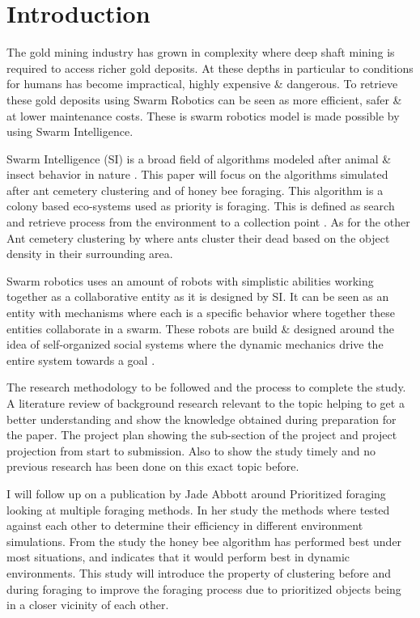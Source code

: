 \documentclass[12pt]{article}
\begin{document}
\section{Introduction}

\par{The gold mining industry has grown in complexity where deep shaft mining is required to access richer gold deposits. At these depths in particular to conditions for humans has become impractical, highly expensive \& dangerous. To retrieve these gold deposits using Swarm Robotics can be seen as more efficient, safer \& at lower maintenance costs. These is swarm robotics model is made possible by using Swarm Intelligence.}
\\
\par{Swarm Intelligence (SI) is a broad field of algorithms modeled after animal \& insect behavior in nature \cite{SI}. This paper will focus on the algorithms simulated after ant cemetery clustering and of honey bee foraging. This algorithm is a colony based eco-systems used as priority is foraging. This is defined as search and retrieve process from the environment to a collection point \cite{Forage-09}. As for the other Ant cemetery clustering by \cite{Lumer-Faieta} where ants cluster their dead based on the object density in their surrounding area.}
\\
\par{Swarm robotics uses an amount of robots with simplistic abilities working together as a collaborative entity \cite{Robots-Dorigo} as it is designed by SI. It can be seen as an entity with mechanisms where each is a specific behavior where together these entities collaborate in a swarm. These robots are build \& designed around the idea of self-organized social systems where the dynamic mechanics drive the entire system towards a goal \cite{SI}.}
\\
\par{The research methodology to be followed and the process to complete the study. A literature review of background research relevant to the topic helping to get a better understanding and show the knowledge obtained during preparation for the paper. The project plan showing the sub-section of the project and project projection from start to submission. Also to show the study timely and no previous research has been done on this exact topic before.}
\\
\par{I will follow up on a publication by Jade Abbott \cite{Jade-2014} around Prioritized foraging looking at multiple foraging methods. In her study the methods where tested against each other to determine their efficiency in different environment simulations. From the study the honey bee algorithm has performed best under most situations, and indicates that it would perform best in dynamic environments. This study will introduce the property of clustering before and during foraging to improve the foraging process due to prioritized objects being in a closer vicinity of each other.}
\end{document}
